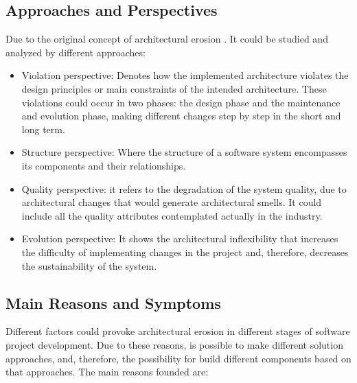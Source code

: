 \subsection{Approaches and Perspectives}
Due to the original concept of architectural erosion \citet{slr-base}. It could be studied and analyzed by different approaches:

\begin{itemize}
    \item Violation perspective: Denotes how the implemented architecture violates the design principles or main constraints of the intended architecture. These violations could occur in two phases: the design phase and the maintenance and evolution phase, making different changes step by step in the short and long term.
    \item Structure perspective: Where the structure of a software system encompasses its components and their relationships.
    \item Quality perspective: it refers to the degradation of the system quality, due to architectural changes that would generate architectural smells. It could include all the quality attributes contemplated actually in the industry.
    \item Evolution perspective: It shows the architectural inflexibility that increases the difficulty of implementing changes in the project and, therefore, decreases the sustainability of the system.

\end{itemize}

\subsection{Main Reasons and Symptoms }
Different factors could provoke architectural erosion in different stages of software project development. Due to these reasons, is possible to make different solution approaches, and, therefore, the possibility for build different components based on that approaches. The main reasons founded are:	

